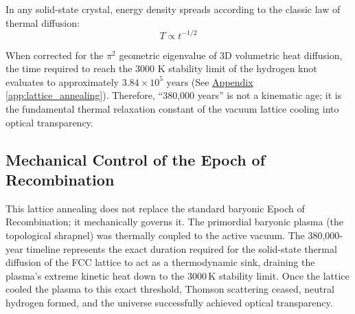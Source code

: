 In any solid-state crystal, energy density spreads according to the classic law of thermal diffusion:
\begin{equation}
    T \propto t^{-1/2}
\end{equation}

When corrected for the $\pi^2$ geometric eigenvalue of 3D volumetric heat diffusion, the time required to reach the $3000 \text{ K}$ stability limit of the hydrogen knot evaluates to approximately $3.84 \times 10^5 \text{ years}$ (See \hyperref[app:lattice_annealing]{Appendix \ref*{app:lattice_annealing}}). Therefore, ``380,000 years'' is not a kinematic age; it is the fundamental thermal relaxation constant of the vacuum lattice cooling into optical transparency.

\subsection{Mechanical Control of the Epoch of Recombination}
\label{sec:mechanical_control_recombination}

This lattice annealing does not replace the standard baryonic Epoch of Recombination; it mechanically governs it. The primordial baryonic plasma (the topological shrapnel) was thermally coupled to the active vacuum. The 380,000-year timeline represents the exact duration required for the solid-state thermal diffusion of the FCC lattice to act as a thermodynamic sink, draining the plasma's extreme kinetic heat down to the $3000\,\text{K}$ stability limit. Once the lattice cooled the plasma to this exact threshold, Thomson scattering ceased, neutral hydrogen formed, and the universe successfully achieved optical transparency.
